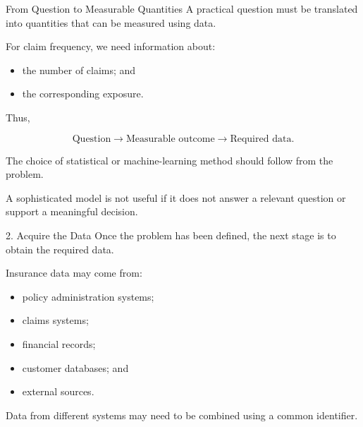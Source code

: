 \documentclass[
  ignorenonframetext,
  aspectratio=169,
]{beamer}
\providecommand{\tightlist}{%
  \setlength{\itemsep}{0pt}\setlength{\parskip}{0pt}}
\begin{document}
\begin{frame}{From Question to Measurable Quantities}
\protect{}\label{from-question-to-measurable-quantities}
A practical question must be translated into quantities that can be
measured using data.

For claim frequency, we need information about:

\begin{itemize}
\tightlist
\item
  the number of claims; and
\item
  the corresponding exposure.
\end{itemize}

Thus,

\[
\text{Question}
\rightarrow
\text{Measurable outcome}
\rightarrow
\text{Required data}.
\]

\begin{tcolorbox}[enhanced jigsaw, arc=.35mm, bottomrule=.15mm, bottomtitle=1mm, breakable, colback=white, colbacktitle=quarto-callout-important-color!10!white, colframe=quarto-callout-important-color-frame, coltitle=black, left=2mm, leftrule=.75mm, opacityback=0, opacitybacktitle=0.6, rightrule=.15mm, title=\textcolor{quarto-callout-important-color}{\faExclamation}\hspace{0.5em}{Start with the decision, not the model}, titlerule=0mm, toprule=.15mm, toptitle=1mm]

The choice of statistical or machine-learning method should follow from
the problem.

A sophisticated model is not useful if it does not answer a relevant
question or support a meaningful decision.

\end{tcolorbox}
\end{frame}

\begin{frame}{2. Acquire the Data}
\protect{}\label{acquire-the-data}
Once the problem has been defined, the next stage is to obtain the
required data.

Insurance data may come from:

\begin{itemize}
\tightlist
\item
  policy administration systems;
\item
  claims systems;
\item
  financial records;
\item
  customer databases; and
\item
  external sources.
\end{itemize}

Data from different systems may need to be combined using a common
identifier.
\end{frame}
\end{document}
